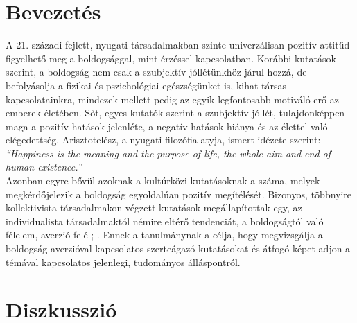 \section{Bevezetés}
A 21. századi fejlett, nyugati társadalmakban szinte univerzálisan pozitív attitűd figyelhető meg a boldogsággal, mint érzéssel kapcsolatban. Korábbi kutatások szerint, a boldogság nem csak a szubjektív jóllétünkhöz járul hozzá, de befolyásolja a fizikai és pszichológiai egészségünket is, kihat társas kapcsolatainkra, mindezek mellett pedig az egyik legfontosabb motiváló erő az emberek életében. Sőt, egyes kutatók szerint a szubjektív jóllét, tulajdonképpen maga a pozitív hatások jelenléte, a negatív hatások hiánya és az élettel való elégedettség.\cite{diener_suh_lucas_smith_1999} Arisztotelész, a nyugati filozófia atyja, ismert idézete szerint: \textit{“Happiness is the meaning and the purpose of life, the whole aim and end of human existence.”} \medskip 
\\ Azonban egyre bővül azoknak a kultúrközi kutatásoknak a száma, melyek megkérdő\-jelezik  a boldogság egyoldalúan pozitív megítélését. Bizonyos, többnyire kollektivista társadalmakon végzett kutatások megállapítottak egy, az individualista társa\-dalmaktól némire eltérő tendenciát, a boldogságtól való félelem, averzió felé \cite{joshanloo_weijers_2013}; \cite{gruber_mauss_tamir_2011}. Ennek a tanulmánynak a célja, hogy megvizsgálja a boldogság-averzióval kapcsolatos szerteágazó kutatásokat és átfogó képet adjon a témával kapcsolatos jelenlegi, tudományos álláspontról. \medskip 

\pagebreak
\section {Diszkusszió}
